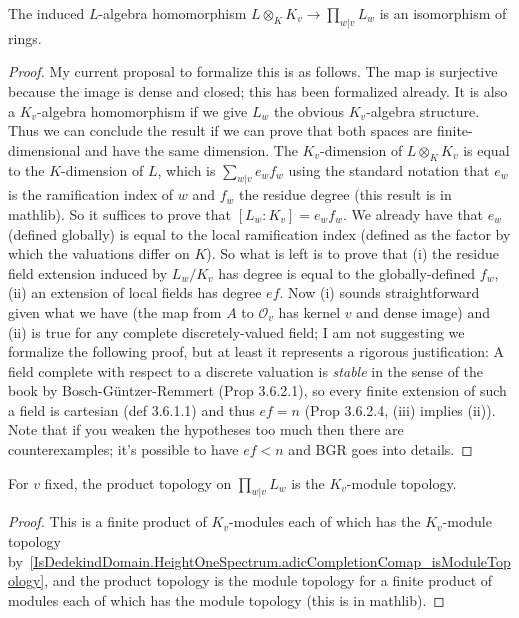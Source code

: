 \begin{theorem}
  \label{IsDedekindDomain.HeightOneSpectrum.adicCompletionComapAlgEquiv}
  \leanok
  The induced $L$-algebra homomorphism $L\otimes_KK_v\to\prod_{w|v}L_w$ is an
  isomorphism of rings.
\end{theorem}
\begin{proof}

  My current proposal to formalize this is as follows. The map is surjective
  because the image is dense and closed; this has been formalized already.
  It is also a $K_v$-algebra homomorphism if we give $L_w$ the obvious $K_v$-algebra
  structure. Thus we can conclude the result if we can prove that both spaces are
  finite-dimensional and have the same dimension. The $K_v$-dimension of $L\otimes_KK_v$
  is equal to the $K$-dimension of $L$, which is $\sum_{w|v}e_wf_w$ using the standard
  notation that $e_w$ is the ramification index of $w$ and $f_w$ the residue degree
  (this result is in mathlib). So it suffices to prove that $[L_w:K_v]=e_wf_w$.
  We already have that $e_w$ (defined globally) is equal to the local ramification
  index (defined as the factor by which the valuations differ on $K$). So what is left
  is to prove that (i) the residue field extension induced by $L_w/K_v$ has degree is equal to the
  globally-defined $f_w$, (ii) an extension of local fields has degree $ef$. Now (i) sounds
  straightforward given what we have (the map from $A$ to $\mathcal{O}_v$ has kernel $v$ and
  dense image) and (ii) is true for any complete discretely-valued field; I am not suggesting
  we formalize the following proof, but at least it represents a rigorous justification:
  A field complete with respect to a discrete valuation is \emph{stable} in the sense
  of the book by Bosch-G\"{u}ntzer-Remmert (Prop 3.6.2.1), so every finite extension of such a field
  is cartesian (def 3.6.1.1) and thus $ef=n$ (Prop 3.6.2.4, (iii) implies (ii)). Note
  that if you weaken the hypotheses too much then there are counterexamples; it's possible
  to have $ef<n$ and BGR goes into details.

\end{proof}

\begin{theorem}
  \label{IsDedekindDomain.HeightOneSpectrum.prodAdicCompletionComap_isModuleTopology}
  \leanok
  For $v$ fixed, the product topology on $\prod_{w|v}L_w$ is the $K_v$-module
  topology.
\end{theorem}
\begin{proof}
  \leanok
  This is a finite product of $K_v$-modules each of which has the $K_v$-module topology
  by~\ref{IsDedekindDomain.HeightOneSpectrum.adicCompletionComap_isModuleTopology},
  and the product topology is the module topology for a finite product of modules each of which
  has the module topology (this is in mathlib).
\end{proof}

